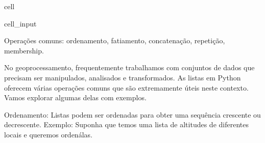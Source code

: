 \documentclass[letterpaper,10pt,english]{jupyterBook}
\begin{document}
\begin{sphinxuseclass}{cell}\begin{sphinxVerbatimInput}

\begin{sphinxuseclass}{cell_input}
\begin{sphinxVerbatim}[commandchars=\\\{\}]
  \PYG{p}{[}    \PYG{p}{]}
 \PYG{p}{[}\PYG{p}{]}  
  
\end{sphinxVerbatim}

\end{sphinxuseclass}\end{sphinxVerbatimInput}

\end{sphinxuseclass}
\sphinxAtStartPar
Operações comuns: ordenamento, fatiamento, concatenação, repetição, membership.

\sphinxAtStartPar
No geoprocessamento, frequentemente trabalhamos com conjuntos de dados que precisam ser manipulados, analisados e transformados. As listas em Python oferecem várias operações comuns que são extremamente úteis neste contexto. Vamos explorar algumas delas com exemplos.

\sphinxAtStartPar
Ordenamento: Listas podem ser ordenadas para obter uma sequência crescente ou decrescente. Exemplo: Suponha que temos uma lista de altitudes de diferentes locais e queremos ordená\sphinxhyphen{}las.
\end{document}
